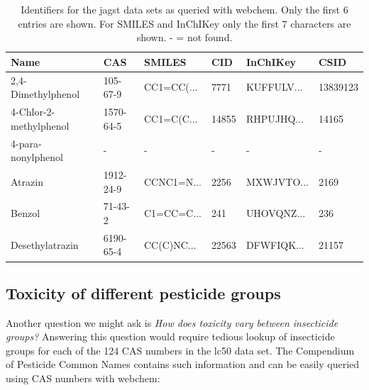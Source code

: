 \begin{table}[ht]
\centering
\small
\begin{tabular}{llllll}
  \toprule
Name & CAS & SMILES & CID & InChIKey & CSID \\ 
  \midrule
2,4-Dimethylphenol & 105-67-9 & CC1=CC(... & 7771 & KUFFULV... & 13839123 \\ 
  4-Chlor-2-methylphenol & 1570-64-5 & CC1=C(C... & 14855 & RHPUJHQ... & 14165 \\ 
  4-para-nonylphenol & - & - & - & - & - \\ 
  Atrazin & 1912-24-9 & CCNC1=N... & 2256 & MXWJVTO... & 2169 \\ 
  Benzol & 71-43-2 & C1=CC=C... & 241 & UHOVQNZ... & 236 \\ 
  Desethylatrazin & 6190-65-4 & CC(C)NC... & 22563 & DFWFIQK... & 21157 \\ 
   \bottomrule
\end{tabular}

\caption[Identifiers for the jagst data sets as queried with webchem.]{Identifiers for the jagst data sets as queried with webchem. Only the first 6 entries are shown. For SMILES and InChIKey only the first 7 characters are shown. - = not found.}
\label{tab:comptable}
\end{table}



\subsection[Toxicity of different pesticide groups]{Toxicity of different pesticide groups}
Another question we might ask is \emph{How does toxicity vary between insecticide groups?}
Answering this question would require tedious lookup of insecticide groups for each of the 124 CAS numbers in the lc50 data set.
The Compendium of Pesticide Common Names \citep{wood} contains such information and can be easily queried using CAS numbers with webchem: 

\begin{knitrout}
\color{fgcolor}\begin{kframe}
\begin{alltt}
 \hlkwb{<-} \hlopt{$}  \hlstd{=} \hlstd{)}
\end{alltt}
\end{kframe}
\end{knitrout}

